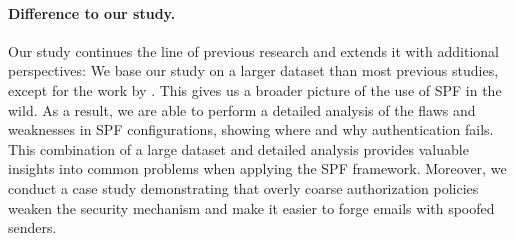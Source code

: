 \paragraph{Difference to our study.}
Our study continues the line of previous research and extends it with additional perspectives:
We base our study on a larger dataset than most previous studies, except for the work by \citet{Kahraman2020}.
This gives us a broader picture of the use of \ac{SPF} in the wild.
As a result, we are able to perform a detailed analysis of the flaws and weaknesses in SPF configurations, showing where and why authentication fails.
This combination of a large dataset and detailed analysis provides valuable insights into common problems when applying the SPF framework.
Moreover, we conduct a case study demonstrating that overly coarse authorization policies weaken the security mechanism and make it easier to forge emails with spoofed senders. 

